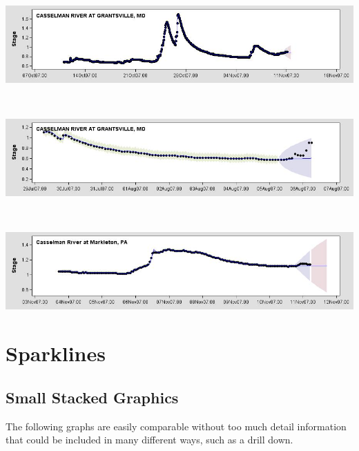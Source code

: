 \documentclass[10pt]{sugconf-ish}
\begin{document}
\begin{minipage}{\linewidth} 
\centering
\includegraphics[width=6in,keepaspectratio]{forecastplot0.jpeg} 
\label{fig:Cassleman1}
\end{minipage}\\
\begin{minipage}{\linewidth} 
\centering
\includegraphics[width=6in,keepaspectratio]{03078000B24_L24_0.jpeg} 
\label{fig:Cassleman2}
\end{minipage}\\
\begin{minipage}{\linewidth} 
\centering
\includegraphics[width=6in,keepaspectratio]{03079000B12_L24_0.jpeg} 
\label{fig:Cassleman3}
\end{minipage}

\newpage
\section{Sparklines}
\subsection{Small Stacked Graphics}
The following graphs are easily comparable without too much detail information that could be included in many different ways, such as a drill down.\\
\end{document}
